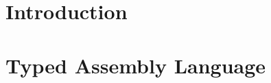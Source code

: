 




\begin{titlepage}
\maketitle
\end{titlepage}
\tableofcontents



\chapter{Introduction}




\chapter{Typed Assembly Language}


% 
% 
% 
% 
% 
% 
% 

% 
% 
% 
% 
% 
% 

\listoftodos[Notes]




